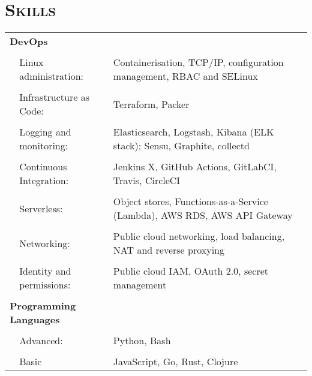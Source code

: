 \documentclass[a4paper,10pt]{article} %
\begin{document}

\section{\textsc{Skills}}
\begin{tabularx}{\textwidth}{p{0.3cm}|p{4cm}X}
\multicolumn{2}{l}{\textbf{DevOps}} & \\
\multicolumn{3}{c}{} \\ %
   & Linux administration:               & Containerisation, TCP/IP, configuration management, RBAC and SELinux \\
     \\
   & Infrastructure as Code:             & Terraform, Packer \\
     \\
   & Logging and monitoring:             & Elasticsearch, Logstash, Kibana (ELK stack); Sensu, Graphite, collectd \\
     \\
   & Continuous Integration:             & Jenkins X, GitHub Actions, GitLabCI, Travis, CircleCI \\
     \\
   & Serverless:                         & Object stores, Functions-as-a-Service (Lambda), AWS RDS, AWS API Gateway \\
     \\
   & Networking:                         & Public cloud networking, load balancing, NAT and reverse proxying \\
     \\
   & Identity and permissions:           & Public cloud IAM, OAuth 2.0, secret management \\
\multicolumn{3}{c}{} \\ %
\multicolumn{2}{l}{\textbf{Programming Languages}}      & \\
\multicolumn{3}{c}{} \\ %
  &  Advanced:                           & Python, Bash \\
     \\
  &  Basic                               & JavaScript, Go, Rust, Clojure \\
\end{tabularx}
\end{document}
